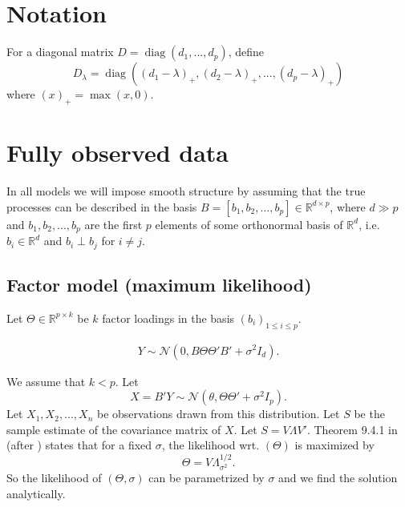 \documentclass{article}
\newcommand{\cN}{\mathcal{N}}
\newcommand{\R}{\mathbb{R}}
\DeclareMathOperator*{\diag}{diag}
\begin{document}
\section{Notation}

For a diagonal matrix $D = \diag(d_1,...,d_p)$, define \[ D_\lambda = \diag((d_1 - \lambda)_+,(d_2 - \lambda)_+,...,(d_p - \lambda)_+) \] where $(x)_+ = \max(x, 0)$.

\section{Fully observed data}

In all models we will impose smooth structure by assuming that the true processes can be described in the basis $B = [b_1,b_2,...,b_p] \in \R^{d \times p}$, where $d \gg p$ and $b_1, b_2, ..., b_p$ are the first $p$ elements of some orthonormal basis of $\R^d$, i.e. $b_i \in \R^d$ and $b_i \perp b_j$ for $i \neq j$.

\subsection{Factor model (maximum likelihood)}

Let $\Theta \in \R^{p \times k}$ be $k$ factor loadings in the basis $(b_i)_{1 \leq i \leq p}$.


\begin{align}\label{eq:model}
  Y \sim \cN(0, B \Theta \Theta' B' + \sigma^2 I_d).
\end{align}

We assume that $k < p$. Let
\begin{equation}
X = B'Y \sim \cN(\theta, \Theta \Theta' + \sigma^2 I_p).\label{model:x}
\end{equation}
Let $X_1,X_2,...,X_n$ be observations drawn from this distribution.
Let $S$ be the sample estimate of the covariance matrix of $X$. Let $S = V \Lambda V'$.
Theorem 9.4.1 in \citet{mardia1980multivariate} (after \citet{joreskog1967some}) states that for a fixed $\sigma$, the likelihood wrt. $(\Theta)$ is maximized by
\[
 \Theta = V\Lambda_{\sigma^2}^{1/2}.
\]
So the likelihood of $(\Theta,\sigma)$ can be parametrized by $\sigma$ and we find the solution analytically.
\end{document}
